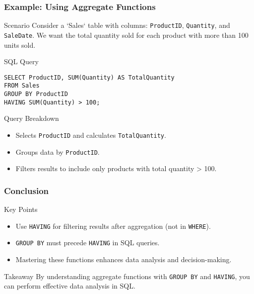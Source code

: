 \documentclass[aspectratio=169]{beamer}
\begin{document}
\begin{frame}[fragile]
    \frametitle{Example: Using Aggregate Functions}
    \begin{block}{Scenario}
        Consider a `Sales` table with columns: \texttt{ProductID}, \texttt{Quantity}, and \texttt{SaleDate}. We want the total quantity sold for each product with more than 100 units sold.
    \end{block}

    \begin{block}{SQL Query}
        \begin{lstlisting}
SELECT ProductID, SUM(Quantity) AS TotalQuantity
FROM Sales
GROUP BY ProductID
HAVING SUM(Quantity) > 100;
        \end{lstlisting}
    \end{block}

    \begin{block}{Query Breakdown}
        \begin{itemize}
            \item Selects \texttt{ProductID} and calculates \texttt{TotalQuantity}.
            \item Groups data by \texttt{ProductID}.
            \item Filters results to include only products with total quantity > 100.
        \end{itemize}
    \end{block}
\end{frame}

\begin{frame}[fragile]
    \frametitle{Conclusion}
    \begin{block}{Key Points}
        \begin{itemize}
            \item Use \texttt{HAVING} for filtering results after aggregation (not in \texttt{WHERE}).
            \item \texttt{GROUP BY} must precede \texttt{HAVING} in SQL queries.
            \item Mastering these functions enhances data analysis and decision-making.
        \end{itemize}
    \end{block}
    
    \begin{block}{Takeaway}
        By understanding aggregate functions with \texttt{GROUP BY} and \texttt{HAVING}, you can perform effective data analysis in SQL.
    \end{block}
\end{frame}
\end{document}
